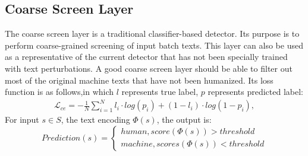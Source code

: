 \documentclass[11pt]{article}
\begin{document}
	\subsection{Coarse Screen Layer}
	\label{sec:first_stage}
	The coarse screen layer is a traditional classifier-based detector. Its purpose is to perform coarse-grained screening of input batch texts. This layer can also be used as a representative of the current detector that has not been specially trained with text perturbations. A good coarse screen layer should be able to filter out most of the original machine texts that have not been humanized. Its loss function is as follows,in which $l$ represents true label, $p$ represents predicted label:
  \begin{equation}
    \begin{aligned}
        \label{eq:loss_ce}
        \mathcal L_{ce}=-\frac{1}{N}\displaystyle\sum_{i=1}^N l_i\cdot log(p_i)+(1-l_i)\cdot log(1-p_i),
    \end{aligned}
\end{equation}
For input $s \in S$, the text encoding $\Phi(s)$, the output is:
\begin{equation}
	\label{ineq:seq_equal}
		Prediction(s) = 
		\begin{cases}
			human, score(\Phi(s))>threshold \\
			machine, scores(\Phi(s)) < threshold
		\end{cases}
	\end{equation}

	
\end{document}
